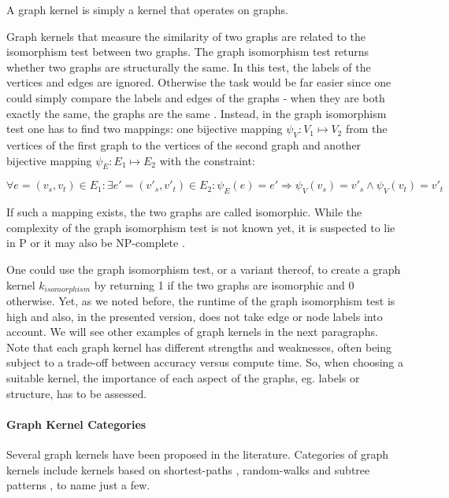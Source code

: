 A graph kernel is simply a kernel that operates on graphs.

Graph kernels that measure the similarity of two graphs are related to the isomorphism test \cite[p.~4]{Bondy1976} between two graphs.
The graph isomorphism test returns whether two graphs are structurally the same.
In this test, the labels of the vertices and edges are ignored. Otherwise the task would be far easier since one could simply compare the labels and edges of the graphs - when they are both exactly the same, the graphs are the same \cite[p.~4]{Bondy1976}.
Instead, in the graph isomorphism test one has to find two mappings: one bijective mapping $\psi_{V}: V_1 \mapsto V_2$ from the vertices of the first graph to the vertices of the second graph and another bijective mapping $\psi_{E}: E_1 \mapsto E_2$ with the constraint:

\begin{equation*}
    \forall e = (v_s, v_t) \in E_1:
    \exists e' = (v'_s, v'_t) \in E_2:
    \psi_{E}(e) = e'
    \Rightarrow
    \psi_{V}(v_s) = v'_s
    \land
    \psi_{V}(v_t) = v'_t
\end{equation*}

If such a mapping exists, the two graphs are called isomorphic.
While the complexity of the graph isomorphism test is not known yet, it is suspected to lie in P or it may also be NP-complete \cite{Hido2009,Kulharia2008}.
 
One could use the graph isomorphism test, or a variant thereof, to create a graph kernel $k_{isomorphism}$ by returning 1 if the two graphs are isomorphic and 0 otherwise.
Yet, as we noted before, the runtime of the graph isomorphism test is high and also, in the presented version, does not take edge or node labels into account.
We will see other examples of graph kernels in the next paragraphs.
Note that each graph kernel has different strengths and weaknesses, often being subject to a trade-off between accuracy versus compute time.
So, when choosing a suitable kernel, the importance of each aspect of the graphs, eg. labels or structure, has to be assessed.


\paragraph{Graph Kernel Categories}
Several graph kernels have been proposed in the literature.
Categories of graph kernels include kernels based on shortest-paths \cite{Hermansson2015, Borgwardt2005, Nikolentzos2017b}, random-walks \cite{Neuhaus2006a} and subtree patterns \cite{Shervashidze2009,Douglas2011,Kersting2013}, to name just a few.

